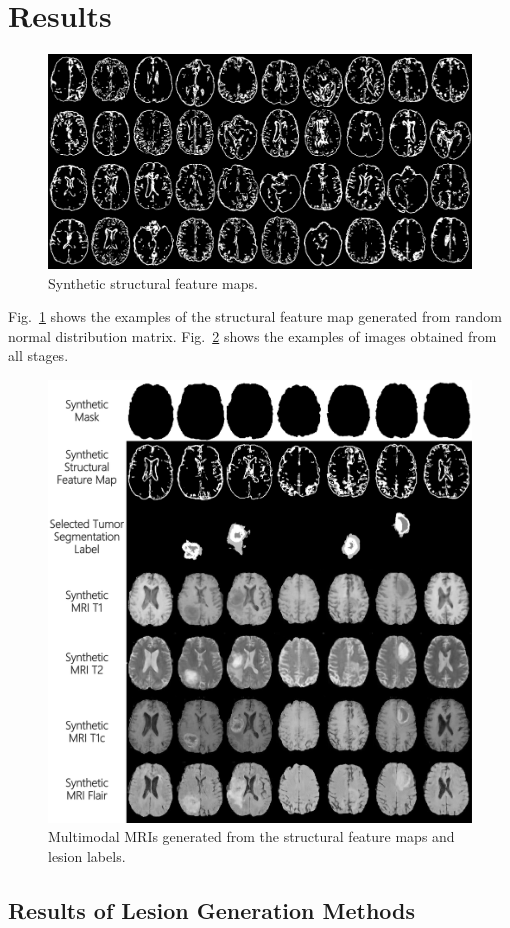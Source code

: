 \documentclass[letterpaper]{article} %
\begin{document}
\section{Results}
\begin{figure}
	\centering
	\includegraphics[width=0.65\linewidth]{figures/Fs}
	\caption{Synthetic structural feature maps.}
	\label{generated_f}
\end{figure}
Fig.~\ref{generated_f} shows the examples of the structural feature map generated from random normal distribution matrix. Fig.~\ref{generated_mri} shows the examples of images obtained from all stages.
\begin{figure}
	\centering
	\includegraphics[width=0.65\linewidth]{figures/F_to_MRI}
	\caption{Multimodal MRIs generated from the structural feature maps and lesion labels.}
	\label{generated_mri}
\end{figure}
\subsection{Results of Lesion Generation Methods}
\begin{table}[t]
	\caption{Lesion generation methods experiments}\smallskip
	\centering
	\label{label_test}	
\end{table}
\end{document}
